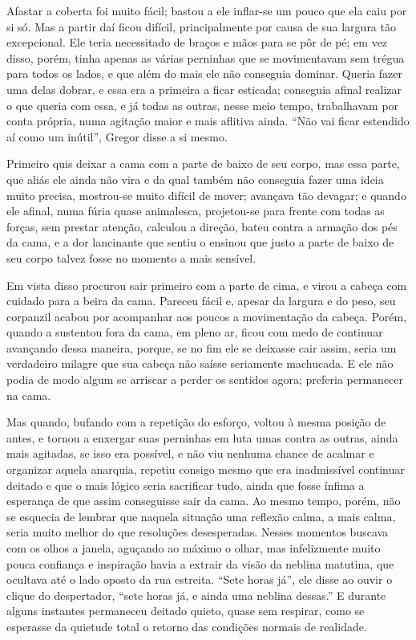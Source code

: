 Afastar a coberta foi muito fácil; bastou a ele inflar-se um pouco que ela
caiu por si só. Mas a partir daí ficou difícil, principalmente por causa
de sua largura tão excepcional. Ele teria necessitado de braços e mãos
para se pôr de pé; em vez disso, porém, tinha apenas as várias perninhas
que se movimentavam sem trégua para todos os lados, e que além do mais ele
não conseguia dominar. Queria fazer uma delas dobrar, e essa era a
primeira a ficar esticada; conseguia afinal realizar o que queria com
essa, e já todas as outras, nesse meio tempo, trabalhavam por conta
própria, numa agitação maior e mais aflitiva ainda. “Não vai ficar
estendido aí como um inútil”, Gregor disse a si mesmo.

Primeiro quis deixar a cama com a parte de baixo de seu corpo, mas essa
parte, que aliás ele ainda não vira e da qual também não conseguia fazer
uma ideia muito precisa, mostrou-se muito difícil de mover; avançava tão
devagar; e quando ele afinal, numa fúria quase animalesca, projetou-se
para frente com todas as forças, sem prestar atenção, calculou a direção, bateu contra a armação dos pés da cama, e a dor
lancinante que sentiu o ensinou que justo a parte de baixo de seu corpo
talvez fosse no momento a mais sensível.

Em vista disso procurou sair primeiro com a parte de cima, e virou a
cabeça com cuidado para a beira da cama. Pareceu fácil e, apesar da
largura e do peso, seu corpanzil acabou por acompanhar aos poucos a
movimentação da cabeça. Porém, quando a sustentou fora da cama, em pleno
ar, ficou com medo de continuar avançando dessa maneira, porque, se no fim
ele se deixasse cair assim, seria um verdadeiro milagre que sua cabeça não
saísse seriamente machucada. E ele não podia de modo algum se arriscar a
perder os sentidos agora; preferia permanecer na cama.

Mas quando, bufando com a repetição do esforço, voltou à mesma posição de
antes, e tornou a enxergar suas perninhas em luta umas contra as outras,
ainda mais agitadas, se isso era possível, e não viu nenhuma chance de
acalmar e organizar aquela anarquia, repetiu consigo mesmo que era
inadmissível continuar deitado e que o mais lógico seria sacrificar tudo,
ainda que fosse ínfima a esperança de que assim conseguisse sair da cama.
Ao mesmo tempo, porém, não se esquecia de lembrar que naquela situação uma
reflexão calma, a mais calma, seria muito melhor do que resoluções
desesperadas. Nesses momentos buscava com os olhos a janela, aguçando ao
máximo o olhar, mas infelizmente muito pouca confiança e inspiração havia
a extrair da visão da neblina matutina, que ocultava até o lado oposto da
rua estreita. “Sete horas já”, ele disse ao ouvir o clique do despertador,
“sete horas já, e ainda uma neblina dessas.” E durante alguns instantes
permaneceu deitado quieto, quase sem respirar, como se esperasse da
quietude total o retorno das condições normais de realidade.

